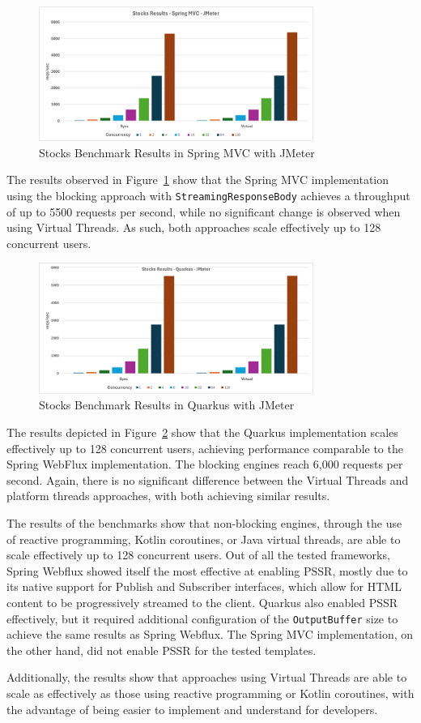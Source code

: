 \begin{figure}[h]
     \centering
     \includegraphics[width=0.8\textwidth]{./Graphs/stocks-springmvc-jmeter.png}
     \caption{Stocks Benchmark Results in Spring MVC with JMeter}\label{fig:stocks-springmvc-jmeter}
\end{figure}

The results observed in Figure~\ref{fig:stocks-springmvc-jmeter} show that the
Spring MVC implementation using the blocking approach with
\texttt{StreamingResponseBody} achieves a throughput of up to 5500 requests per
second, while no significant change is observed when using Virtual Threads. As
such, both approaches scale effectively up to 128 concurrent users.

\begin{figure}[h]
     \centering
     \includegraphics[width=0.8\textwidth]{./Graphs/stocks-quarkus-jmeter.png}
     \caption{Stocks Benchmark Results in Quarkus with JMeter}\label{fig:stocks-quarkus-jmeter}
\end{figure}

The results depicted in Figure~\ref{fig:stocks-quarkus-jmeter} show that the
Quarkus implementation scales effectively up to 128 concurrent users, achieving
performance comparable to the Spring WebFlux implementation. The blocking
engines reach 6,000 requests per second. Again, there is no significant
difference between the Virtual Threads and platform threads approaches, with
both achieving similar results.

The results of the benchmarks show that non-blocking engines, through the use
of reactive programming, Kotlin coroutines, or Java virtual threads, are able
to scale effectively up to 128 concurrent users. Out of all the tested
frameworks, Spring Webflux showed itself the most effective at enabling PSSR,
mostly due to its native support for Publish and Subscriber interfaces, which
allow for HTML content to be progressively streamed to the client. Quarkus also
enabled PSSR effectively, but it required additional configuration of the
\texttt{OutputBuffer} size to achieve the same results as Spring Webflux. The
Spring MVC implementation, on the other hand, did not enable PSSR for the
tested templates.

Additionally, the results show that approaches using Virtual Threads are able
to scale as effectively as those using reactive programming or Kotlin
coroutines, with the advantage of being easier to implement and understand for 
developers. 